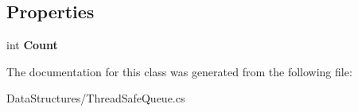 \subsection*{Properties}
\begin{DoxyCompactItemize}
\item 
\mbox{\label{class_data_structures_1_1_thread_safe_queue_af36d256d73d824356ad93c686d7c5aff}} 
int {\bfseries Count}
\end{DoxyCompactItemize}


The documentation for this class was generated from the following file\+:\begin{DoxyCompactItemize}
\item 
Data\+Structures/Thread\+Safe\+Queue.\+cs\end{DoxyCompactItemize}
